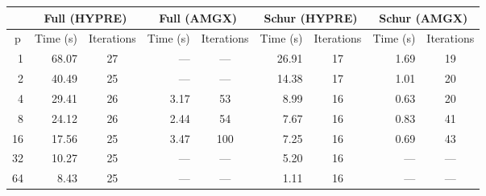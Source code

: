 \documentclass{standalone}
\begin{document}
\begin{tabular}{@{}r|rc|rc|rc|rc}
\toprule
\multicolumn{1}{c}{} &  
\multicolumn{2}{c}{Full (HYPRE)} & 
\multicolumn{2}{c}{Full (AMGX)} & 
\multicolumn{2}{c}{Schur (HYPRE)} & 
\multicolumn{2}{c}{Schur (AMGX)} \\
\midrule
\multicolumn{1}{c}{p} 
& \multicolumn{1}{c}{Time (s)}
& \multicolumn{1}{c}{Iterations} 
& \multicolumn{1}{c}{Time (s)}
& \multicolumn{1}{c}{Iterations}
& \multicolumn{1}{c}{Time (s)}
& \multicolumn{1}{c}{Iterations}
& \multicolumn{1}{c}{Time (s)}
& \multicolumn{1}{c}{Iterations} \\
\midrule
  1 &        68.07 &           27 &         --- &         --- &         26.91 &           17 &         1.69 &          19 \\
  2 &        40.49 &           25 &         --- &         --- &         14.38 &           17 &         1.01 &          20 \\
  4 &        29.41 &           26 &        3.17 &          53 &          8.99 &           16 &         0.63 &          20 \\
  8 &        24.12 &           26 &        2.44 &          54 &          7.67 &           16 &         0.83 &          41 \\
 16 &        17.56 &           25 &        3.47 &         100 &          7.25 &           16 &         0.69 &          43 \\
 32 &        10.27 &           25 &         --- &         --- &          5.20 &           16 &          --- &         --- \\
 64 &         8.43 &           25 &         --- &         --- &          1.11 &           16 &          --- &         --- \\
\bottomrule
\end{tabular}
\end{document}
